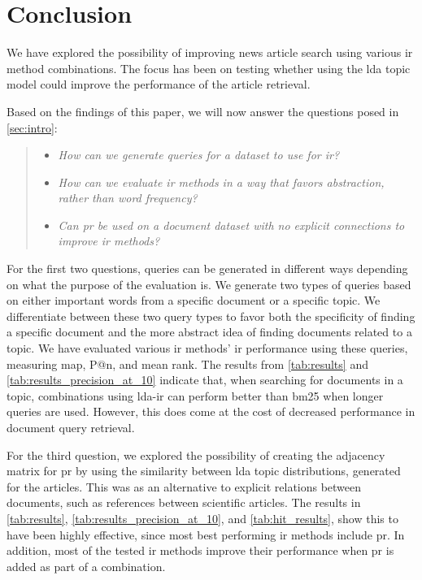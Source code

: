 \section{Conclusion}\label{sec:conclusion}
We have explored the possibility of improving news article search using various \gls{ir} method combinations.
The focus has been on testing whether using the \gls{lda} topic model could improve the performance of the article retrieval.

Based on the findings of this paper, we will now answer the questions posed in \autoref{sec:intro}:
\begin{quote}
	\begin{itemize}
		\item \emph{How can we generate queries for a dataset to use for \gls{ir}?}
		\item \emph{How can we evaluate \gls{ir} methods in a way that favors abstraction, rather than word frequency?}
		\item \emph{Can \gls{pr} be used on a document dataset with no explicit connections to improve \gls{ir} methods?}
	\end{itemize}
\end{quote}

For the first two questions, queries can be generated in different ways depending on what the purpose of the evaluation is.
We generate two types of queries based on either important words from a specific document or a specific topic.
We differentiate between these two query types to favor both the specificity of finding a specific document and the more abstract idea of finding documents related to a topic.
We have evaluated various \gls{ir} methods' \gls{ir} performance using these queries, measuring \acrlong{map}, P@n, and mean rank.
The results from \autoref{tab:results} and \autoref{tab:results_precision_at_10} indicate that, when searching for documents in a topic, combinations using \gls{lda}-\gls{ir} can perform better than \gls{bm25} when longer queries are used.
However, this does come at the cost of decreased performance in document query retrieval.

For the third question, we explored the possibility of creating the adjacency matrix for \gls{pr} by using the similarity between \gls{lda} topic distributions, generated for the articles.
This was as an alternative to explicit relations between documents, such as references between scientific articles.
The results in \autoref{tab:results}, \autoref{tab:results_precision_at_10}, and \autoref{tab:hit_results}, show this to have been highly effective, since most best performing \gls{ir} methods include \gls{pr}.
In addition, most of the tested \gls{ir} methods improve their performance when \gls{pr} is added as part of a combination.

